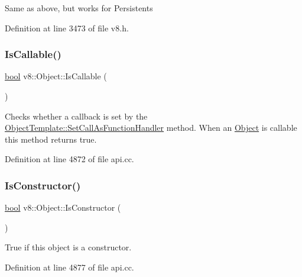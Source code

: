 Same as above, but works for Persistents 

Definition at line 3473 of file v8.\+h.

\mbox{\label{classv8_1_1Object_a23c2c1f23b50fab4a02e2f819641b865}} 
\subsubsection{\texorpdfstring{Is\+Callable()}{IsCallable()}}
{\footnotesize\ttfamily \mbox{\hyperlink{classbool}{bool}} v8\+::\+Object\+::\+Is\+Callable (\begin{DoxyParamCaption}{ }\end{DoxyParamCaption})}

Checks whether a callback is set by the \mbox{\hyperlink{classv8_1_1ObjectTemplate_a1775c8f73e643c339804d2f5b628eddf}{Object\+Template\+::\+Set\+Call\+As\+Function\+Handler}} method. When an \mbox{\hyperlink{classv8_1_1Object}{Object}} is callable this method returns true. 

Definition at line 4872 of file api.\+cc.

\mbox{\label{classv8_1_1Object_a257233cb6b11dc7bb5a0e8df8695e889}} 
\subsubsection{\texorpdfstring{Is\+Constructor()}{IsConstructor()}}
{\footnotesize\ttfamily \mbox{\hyperlink{classbool}{bool}} v8\+::\+Object\+::\+Is\+Constructor (\begin{DoxyParamCaption}{ }\end{DoxyParamCaption})}

True if this object is a constructor. 

Definition at line 4877 of file api.\+cc.

\mbox{\label{classv8_1_1Object_a05d2159c7d1b949c2706ab9c3b6c972b}} 
